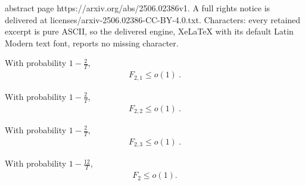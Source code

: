 \documentclass[10pt,a4paper]{amsart}
\begin{document}
abstract page https://arxiv.org/abs/2506.02386v1. A full rights notice is delivered at licenses/arxiv-2506.02386-CC-BY-4.0.txt. Characters: every retained excerpt is pure ASCII, so the delivered engine, XeLaTeX with its default Latin Modern text font, reports no missing character.
\begin{lemma}
\label{lem:Regret_F21}
With probability $1-\frac{2}{T}$,
    \begin{align*}
        F_{2,1}\le o(1)~.
    \end{align*}
\end{lemma}

\begin{lemma}
\label{lem:Regret_F22}
With probability $1-\frac{2}{T}$,
    \begin{align*}
        F_{2,2}\le o(1)~.
    \end{align*}
\end{lemma}

\begin{lemma}
\label{lem:Regret_F23}
With probability $1-\frac{2}{T}$,
    \begin{align*}
        F_{2,3}\le o(1)~.
    \end{align*}
\end{lemma}

\begin{lemma}
\label{lem:Regret_F2}
With probability $1-\frac{12}{T}$,
    \begin{align*}
        F_2\le o(1).
    \end{align*}
\end{lemma}
\end{document}
